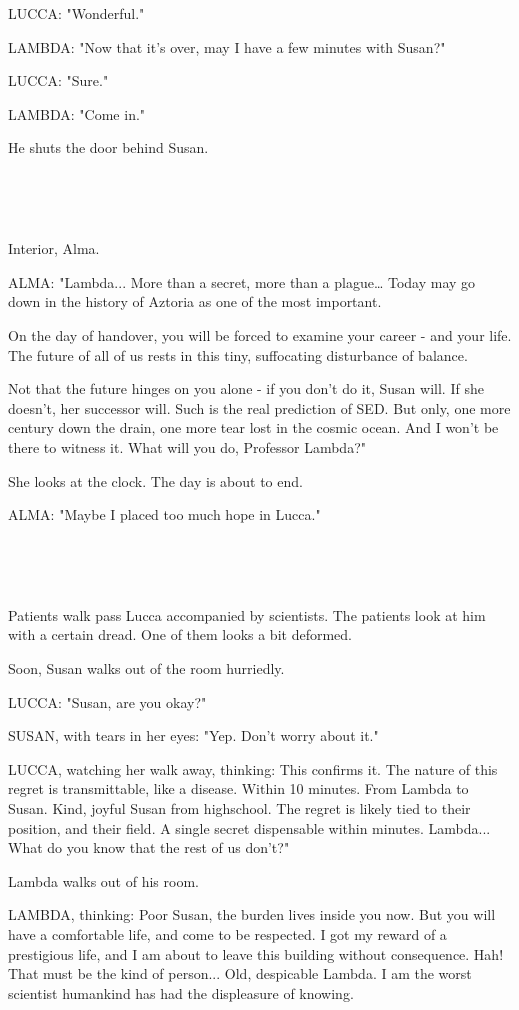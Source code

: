 \documentclass[11pt]{article}
\begin{document}
LUCCA: "Wonderful."

LAMBDA: "Now that it's over, may I have a few minutes with Susan?"

LUCCA: "Sure."

LAMBDA: "Come in."

He shuts the door behind Susan.

\ 

\ 

Interior, Alma.

ALMA: 
"Lambda... More than a secret, more than a plague… Today may go down in the history of Aztoria as one of the most important. 

On the day of handover, you will be forced to examine your career - and your life. The future of all of us rests in this tiny, suffocating disturbance of balance. 

Not that the future hinges on you alone - if you don’t do it, Susan will. If she doesn’t, her successor will. Such is the real prediction of SED. But only, one more century down the drain, one more tear lost in the cosmic ocean. And I won’t be there to witness it. What will you do, Professor Lambda?"

She looks at the clock. The day is about to end.

ALMA: "Maybe I placed too much hope in Lucca."

\ 

\ 

Patients walk pass Lucca accompanied by scientists.
The patients look at him with a certain dread.
One of them looks a bit deformed.

Soon, Susan walks out of the room hurriedly.

LUCCA: "Susan, are you okay?"

SUSAN, with tears in her eyes: "Yep. Don't worry about it."

LUCCA, watching her walk away, thinking: This confirms it. 
The nature of this regret is transmittable, like a disease.
Within 10 minutes. 
From Lambda to Susan.
Kind, joyful Susan from highschool.
The regret is likely tied to their position, and their field.
A single secret dispensable within minutes.
Lambda... What do you know that the rest of us don't?"

Lambda walks out of his room. 

LAMBDA, thinking: 
Poor Susan, the burden lives inside you now.
But you will have a comfortable life, and come to be respected.
I got my reward of a prestigious life, and I am about to leave this building without consequence.
Hah! That must be the kind of person...
Old, despicable Lambda.
I am the worst scientist humankind has had the displeasure of knowing.
\end{document}
